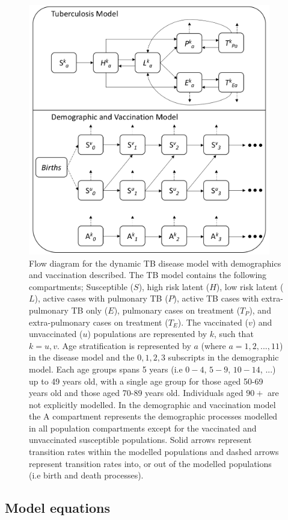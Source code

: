 \documentclass[11pt,twoside]{bristolthesis}
\begin{document}
  \newpage
  \begin{figure}
  
  {\centering \includegraphics[width=400px,]{chapters/model-development/resources/model_diagrams/tb_model_flow} 
  
  }
  
  \caption[Flow diagram for the dynamic TB disease model with demographics and vaccination described.]{Flow diagram for the dynamic TB disease model with demographics and vaccination described. The TB model contains the following compartments; Susceptible ($S$), high risk latent ($H$), low risk latent ($L$), active cases with pulmonary TB ($P$), active TB cases with extra-pulmonary TB only ($E$), pulmonary cases on treatment ($T_P$), and extra-pulmonary cases on treatment ($T_E$). The vaccinated ($v$) and unvaccinated ($u$) populations are represented by $k$, such that $k = u,v$. Age stratification is represented by $a$ (where $a = 1, 2, ...,11$) in the disease model and the $0, 1, 2, 3$ subscripts in the demographic model. Each age groups spans 5 years (i.e $0-4$, $5-9$, $10-14$, ...) up to 49 years old, with a single age group for those aged 50-69 years old and those aged 70-89 years old. Individuals aged $90+$ are not explicitly modelled. In the demographic and vaccination model the A compartment represents the demographic processes modelled in all population compartments except for the vaccinated and unvaccinated susceptible populations. Solid arrows represent transition rates within the modelled populations and dashed arrows represent transition rates into, or out of the modelled populations (i.e birth and death processes).}\label{fig:model-flow-diag}
  \end{figure}
  \hypertarget{model-equations}{%
  \subsection{Model equations}\label{model-equations}}
  
\end{document}
